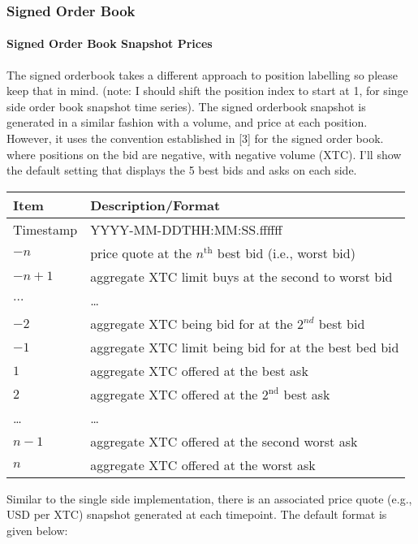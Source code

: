 \subsubsection{Signed Order Book}
\paragraph{Signed Order Book Snapshot Prices}
The signed orderbook takes a different approach to position labelling so please keep that in mind. (note: I should  shift the position index to start at 1, for singe side order book snapshot time series). The signed orderbook snapshot is generated in a similar fashion with a volume, and price at each position. However, it uses the convention established in [3] for the signed order book. where positions on the bid are negative, with negative volume (XTC). I'll show the default setting that displays the 5 best bids and asks on each side.

\begin{center}
	\begin{tabular}{|l|l|}
		\hline
		Item & Description/Format \\
		\hline
		Timestamp & YYYY-MM-DDTHH:MM:SS.ffffff\\ 
		$-n$ & price quote at the $n^{\text{th}}$ best bid (i.e., worst bid) \\
		$-n+1$ & aggregate XTC limit buys at the second to worst bid \\
		$\ldots$ & \ldots \\
		$-2$ & aggregate XTC being bid for at the $2^{nd}$ best bid \\
		$-1$ & aggregate XTC limit being bid for at the best bed bid \\
		$1$ & aggregate XTC offered at the best ask\\
		$2$ & aggregate XTC offered at the $2^{\text{nd}}$ best ask\\
		\ldots & \ldots \\
		$n-1$ & aggregate XTC offered at the second worst ask \\
		$n$ & aggregate XTC offered at the worst ask \\
		\hline
	\end{tabular}
\end{center}


Similar to the single side implementation, there is an associated price quote  (e.g., USD per XTC) snapshot generated at each timepoint. The default format is given below:

